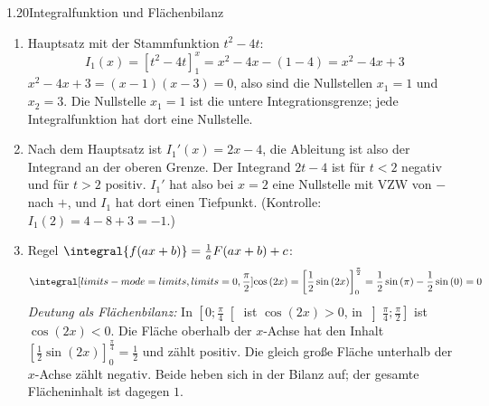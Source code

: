 \begin{loesung}{1.20}{Integralfunktion und Flächenbilanz}
\begin{enumerate}[label=\alph*)]
  \item Hauptsatz mit der Stammfunktion $t^2-4t$:
  \[I_1(x) = \left[t^2-4t\right]_1^x = x^2-4x-(1-4) = x^2-4x+3\]
  $x^2-4x+3 = (x-1)(x-3) = 0$, also sind die Nullstellen $x_1=1$ und $x_2=3$. Die Nullstelle $x_1=1$ ist die untere Integrationsgrenze; jede Integralfunktion hat dort eine Nullstelle.
  \item Nach dem Hauptsatz ist $I_1'(x) = 2x-4$, die Ableitung ist also der Integrand an der oberen Grenze. Der Integrand $2t-4$ ist für $t<2$ negativ und für $t>2$ positiv. $I_1'$ hat also bei $x=2$ eine Nullstelle mit VZW von $-$ nach $+$, und $I_1$ hat dort einen Tiefpunkt. (Kontrolle: $I_1(2) = 4-8+3 = -1$.)
  \item Regel $\integral{f(ax+b)} = \frac{1}{a}F(ax+b)+c$:
  \[\integral[limits-mode=limits,limits={0, \frac{\pi}{2}}]{\cos{(2x)}} = \left[\dfrac{1}{2}\sin{(2x)}\right]_0^{\frac{\pi}{2}} = \dfrac{1}{2}\sin{(\pi)}-\dfrac{1}{2}\sin{(0)} = 0\]
  \textit{Deutung als Flächenbilanz:} In $\left[0;\frac{\pi}{4}\right[$ ist $\cos{(2x)}>0$, in $\left]\frac{\pi}{4};\frac{\pi}{2}\right]$ ist $\cos{(2x)}<0$. Die Fläche oberhalb der $x$-Achse hat den Inhalt $\left[\frac{1}{2}\sin{(2x)}\right]_0^{\frac{\pi}{4}} = \frac{1}{2}$ und zählt positiv. Die gleich große Fläche unterhalb der $x$-Achse zählt negativ. Beide heben sich in der Bilanz auf; der gesamte Flächeninhalt ist dagegen $1$.
\end{enumerate}
\end{loesung}


